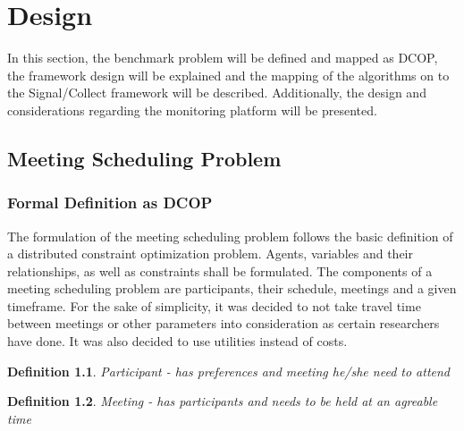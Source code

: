 \chapter{Design}

In this section, the benchmark problem will be defined and mapped as DCOP, the framework design will be explained and the mapping of the algorithms on to the Signal/Collect framework will be described. Additionally, the design and considerations regarding the monitoring platform will be presented.

\section{Meeting Scheduling Problem}

\subsection{Formal Definition as DCOP}

The formulation of the meeting scheduling problem follows the basic definition of a distributed constraint optimization problem. Agents, variables and their relationships, as well as constraints shall be formulated. The components of a meeting scheduling problem are participants, their schedule, meetings and a given timeframe. For the sake of simplicity, it was decided to not take travel time between meetings or other parameters into consideration as certain researchers have done. It was also decided to use utilities instead of costs. %

\theoremstyle{hardconstraint2}
\newtheorem{hardconstraint2}{Definition}
\begin{hardconstraint2}
Participant - has preferences and meeting he/she need to attend
\end{hardconstraint2}
\begin{hardconstraint2}
Meeting - has participants and needs to be held at an agreable time
\end{hardconstraint2}

